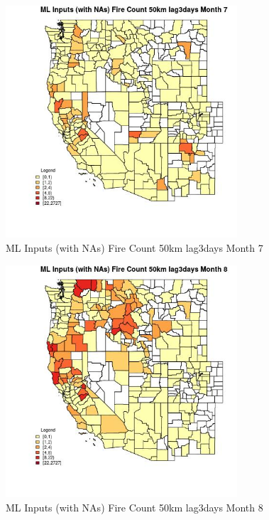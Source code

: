 \begin{figure} 
\centering  
\includegraphics[width=0.77\textwidth]{Code_Outputs/Report_ML_input_PM25_Step4_part_f_de_duplicated_aveswNAs_CountyFire_Count_50km_lag3daysmedianMonth7.jpg} 
\caption{\label{fig:Report_ML_input_PM25_Step4_part_f_de_duplicated_aveswNAsCountyFire_Count_50km_lag3daysmedianMonth7}ML Inputs (with NAs) Fire Count 50km lag3days Month 7} 
\end{figure} 
 

\begin{figure} 
\centering  
\includegraphics[width=0.77\textwidth]{Code_Outputs/Report_ML_input_PM25_Step4_part_f_de_duplicated_aveswNAs_CountyFire_Count_50km_lag3daysmedianMonth8.jpg} 
\caption{\label{fig:Report_ML_input_PM25_Step4_part_f_de_duplicated_aveswNAsCountyFire_Count_50km_lag3daysmedianMonth8}ML Inputs (with NAs) Fire Count 50km lag3days Month 8} 
\end{figure} 
 

